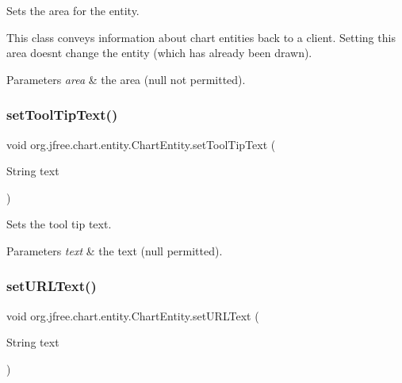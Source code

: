 Sets the area for the entity. 

This class conveys information about chart entities back to a client. Setting this area doesn\textquotesingle{}t change the entity (which has already been drawn).


\begin{DoxyParams}{Parameters}
{\em area} & the area ({\ttfamily null} not permitted). \\
\hline
\end{DoxyParams}
\mbox{\label{classorg_1_1jfree_1_1chart_1_1entity_1_1_chart_entity_a361333c52d6bc762e1751322ca29f56f}} 
\subsubsection{\texorpdfstring{set\+Tool\+Tip\+Text()}{setToolTipText()}}
{\footnotesize\ttfamily void org.\+jfree.\+chart.\+entity.\+Chart\+Entity.\+set\+Tool\+Tip\+Text (\begin{DoxyParamCaption}\item[{String}]{text }\end{DoxyParamCaption})}

Sets the tool tip text.


\begin{DoxyParams}{Parameters}
{\em text} & the text ({\ttfamily null} permitted). \\
\hline
\end{DoxyParams}
\mbox{\label{classorg_1_1jfree_1_1chart_1_1entity_1_1_chart_entity_a20fceefdd3aad1dbca97ef628f910559}} 
\subsubsection{\texorpdfstring{set\+U\+R\+L\+Text()}{setURLText()}}
{\footnotesize\ttfamily void org.\+jfree.\+chart.\+entity.\+Chart\+Entity.\+set\+U\+R\+L\+Text (\begin{DoxyParamCaption}\item[{String}]{text }\end{DoxyParamCaption})}

